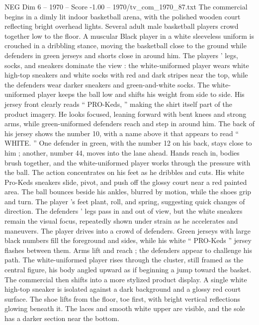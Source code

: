 \begin{textsample}{NEG Dim 6 – 1970 – Score -1.00 – 1970/tv\_com\_1970\_87.txt}  \label{ex:f6_neg_054}
The commercial begins in a dimly lit indoor basketball arena, with the polished wooden court reflecting bright overhead lights.
Several adult male basketball players crowd together low to the floor.
A muscular Black player in a white sleeveless uniform is crouched in a dribbling stance, moving the basketball close to the ground while defenders in green jerseys and shorts close in around him.
The players ’ legs, socks, and sneakers dominate the view : the white-uniformed player wears white high-top sneakers and white socks with red and dark stripes near the top, while the defenders wear darker sneakers and green-and-white socks.
The white-uniformed player keeps the ball low and shifts his weight from side to side.
His jersey front clearly reads “ PRO-Keds, ” making the shirt itself part of the product imagery.
He looks focused, leaning forward with bent knees and strong arms, while green-uniformed defenders reach and step in around him.
The back of his jersey shows the number 10, with a name above it that appears to read “ WHITE. ” One defender in green, with the number 12 on his back, stays close to him ; another, number 44, moves into the lane ahead.
Hands reach in, bodies brush together, and the white-uniformed player works through the pressure with the ball.
The action concentrates on his feet as he dribbles and cuts.
His white Pro-Keds sneakers slide, pivot, and push off the glossy court near a red painted area.
The ball bounces beside his ankles, blurred by motion, while the shoes grip and turn.
The player ’s feet plant, roll, and spring, suggesting quick changes of direction.
The defenders ’ legs pass in and out of view, but the white sneakers remain the visual focus, repeatedly shown under strain as he accelerates and maneuvers.
The player drives into a crowd of defenders.
Green jerseys with large black numbers fill the foreground and sides, while his white “ PRO-Keds ” jersey flashes between them.
Arms lift and reach ; the defenders appear to challenge his path.
The white-uniformed player rises through the cluster, still framed as the central figure, his body angled upward as if beginning a jump toward the basket.
The commercial then shifts into a more stylized product display.
A single white high-top sneaker is isolated against a dark background and a glossy red court surface.
The shoe lifts from the floor, toe first, with bright vertical reflections glowing beneath it.
The laces and smooth white upper are visible, and the sole has a darker section near the bottom.

\end{textsample}
